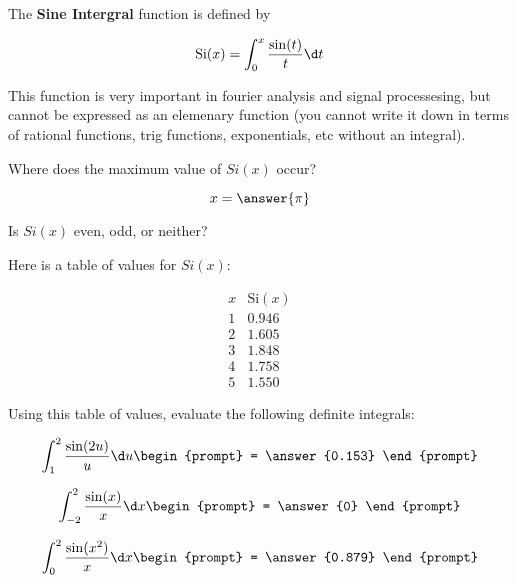 \documentclass{ximera}
\author{Steven Gubkin}
\begin{document}
\begin{exercise}


The \textbf{Sine Intergral} function is defined by

\[
\mathrm{Si}(x) = \int_0^x \frac{\sin(t)}{t} \d t
\]

This function is very important in fourier analysis and signal processesing, but cannot be expressed as an elemenary function (you cannot write it down in terms of rational functions, trig functions, exponentials, etc without an integral).


\begin{exercise}
	Where does the maximum value of $Si(x)$ occur? 
\begin{prompt} 
	\[x = \answer{\pi}\]
\end{prompt}
\end{exercise}

\begin{exercise}
	Is $Si(x)$ even, odd, or neither?
\begin{prompt}
	\begin{multipleChoice}
	\end{multipleChoice}
\end{prompt}
\end{exercise}

Here is a table of values for $Si(x)$:

\[
\begin{array}{c|c}
 x & \mathrm{Si}(x)\\ \hline
1 &  0.946\\
2 & 1.605\\
3 & 1.848\\
4 & 1.758\\
5 & 1.550
\end{array}
\]


Using this table of values, evaluate the following definite integrals:

\begin{exercise}
	\[
	\int_1^2 \frac{\sin(2u)}{u} \d u \begin{prompt} = \answer{0.153} \end{prompt} 
	\]
\end{exercise}

\begin{exercise}
	\[
	\int_{-2}^2 \frac{\sin(x)}{x} \d x \begin{prompt} = \answer{0} \end{prompt}
	\]
\end{exercise}

\begin{exercise}
	\[
	\int_0^2 \frac{\sin(x^2)}{x} \d x \begin{prompt} = \answer{0.879} \end{prompt}  
	\]
\end{exercise}

\end{exercise}
\end{document}

